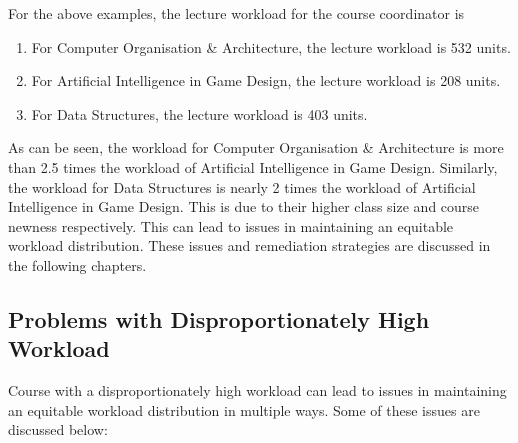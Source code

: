 For the above examples, the lecture workload for the course coordinator is

\begin{enumerate}
  \item For Computer Organisation \& Architecture, the lecture workload is 532 units.
  \item For Artificial Intelligence in Game Design, the lecture workload is 208 units.
  \item For Data Structures, the lecture workload is 403 units.
\end{enumerate}

As can be seen, the workload for Computer Organisation \& Architecture is more than 2.5 times the workload of Artificial Intelligence in Game Design. Similarly, the workload for Data Structures is nearly 2 times the workload of Artificial Intelligence in Game Design. This is due to their higher class size and course newness respectively. This can lead to issues in maintaining an equitable workload distribution. These issues and remediation strategies are discussed in the following chapters.

\subsection{Problems with Disproportionately High Workload}

Course with a disproportionately high workload can lead to issues in maintaining an equitable workload distribution in multiple ways. Some of these issues are discussed below:

